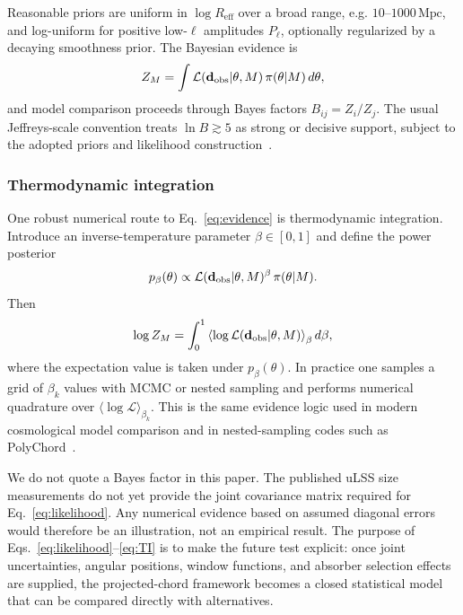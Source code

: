 \documentclass[
  aps,
  prd,
  reprint,
  superscriptaddress,
  nofootinbib,
  longbibliography,
  floatfix,
  amsmath,
  amssymb
]{revtex4-2}
\theoremstyle{plain}
\theoremstyle{definition}
\theoremstyle{remark}
\newcommand{\Reff}{R_{\mathrm{eff}}}
\begin{document}
Reasonable priors are uniform in $\log\Reff$ over a broad range, e.g.
$10$--$1000\,\mathrm{Mpc}$, and log-uniform for positive low-$\ell$
amplitudes $P_\ell$, optionally regularized by a decaying smoothness
prior. The Bayesian evidence is
\begin{equation}
  Z_M=\int \mathcal L(\mathbf d_{\rm obs}|\theta,M)\,
       \pi(\theta|M)\,d\theta,
  \label{eq:evidence}
\end{equation}
and model comparison proceeds through Bayes factors $B_{ij}=Z_i/Z_j$.
The usual Jeffreys-scale convention treats $\ln B\gtrsim5$ as strong or
decisive support, subject to the adopted priors and likelihood
construction~\cite{Trotta2008,Vardanyan2009}.

\subsubsection{Thermodynamic integration}

One robust numerical route to Eq.~\eqref{eq:evidence} is thermodynamic
integration. Introduce an inverse-temperature parameter $\beta\in[0,1]$
and define the power posterior
\begin{equation}
  p_\beta(\theta)\propto
  \mathcal L(\mathbf d_{\rm obs}|\theta,M)^\beta\,\pi(\theta|M).
  \label{eq:powerpost}
\end{equation}
Then
\begin{equation}
  \log Z_M = \int_0^1
  \left\langle \log\mathcal L(\mathbf d_{\rm obs}|\theta,M)\right\rangle_\beta
  d\beta,
  \label{eq:TI}
\end{equation}
where the expectation value is taken under $p_\beta(\theta)$. In
practice one samples a grid of $\beta_k$ values with MCMC or nested
sampling and performs numerical quadrature over
$\langle\log\mathcal L\rangle_{\beta_k}$. This is the same evidence logic
used in modern cosmological model comparison and in nested-sampling
codes such as PolyChord~\cite{Trotta2008,Handley2015}.

We do not quote a Bayes factor in this paper. The published uLSS size
measurements do not yet provide the joint covariance matrix required for
Eq.~\eqref{eq:likelihood}. Any numerical evidence based on assumed
diagonal errors would therefore be an illustration, not an empirical
result. The purpose of Eqs.~\eqref{eq:likelihood}--\eqref{eq:TI} is to
make the future test explicit: once joint uncertainties, angular
positions, window functions, and absorber selection effects are supplied,
the projected-chord framework becomes a closed statistical model that can
be compared directly with alternatives.
\end{document}
